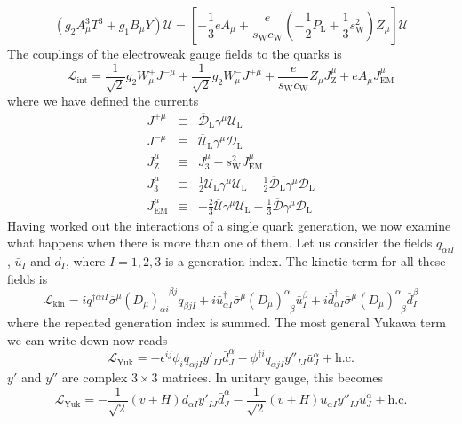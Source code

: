 \[(g_2A^3_{\mu}T^3 + g_1 B_{\mu} Y) \mathcal{U} = \left[ - \frac{1}{3}eA_{\mu} + \frac{e}{s_{\mathrm{W}} c_{\mathrm{W}}}( -\frac{1}{2}P_{\mathrm{L}} +\frac{1}{3}  s_{\mathrm{W}}^2)Z_{\mu} \right] \mathcal{U}\]
The couplings of the electroweak gauge fields to the quarks is
\[\mathcal{L}_{\mathrm{int}} = \frac{1}{\sqrt{2}}g_2W_{\mu}^{+} J^{-\mu} + \frac{1}{\sqrt{2}}g_2W_{\mu}^{-} J^{+\mu} +  \frac{e}{s_{\mathrm{W}} c_{\mathrm{W}}} Z_{\mu}J_{\mathrm{Z}}^{\mu} + eA_{\mu}J^{\mu}_{\mathrm{EM}}\] 
where we have defined the currents
\begin{eqnarray}
J^{+\mu} &\equiv & \overline{\mathcal{D}}_{\mathrm{L}} \gamma^{\mu} \mathcal{U}_{\mathrm{L}} \nonumber \\
J^{-\mu} &\equiv & \overline{\mathcal{U}}_{\mathrm{L}} \gamma^{\mu} \mathcal{D}_{\mathrm{L}} \nonumber \\
J_{\mathrm{Z}}^{\mu} &\equiv & J_3^{\mu} - s_{\mathrm{W}}^2 J^{\mu}_{\mathrm{EM}} \nonumber \\
J_3^{\mu} &\equiv & \frac{1}{2}\overline{\mathcal{U}}_{\mathrm{L}} \gamma^{\mu} \mathcal{U}_{\mathrm{L}} - \frac{1}{2}\overline{\mathcal{D}}_{\mathrm{L}} \gamma^{\mu} \mathcal{D}_{\mathrm{L}} \nonumber \\
J^{\mu}_{\mathrm{EM}} &\equiv &  +\frac{2}{3}\overline{\mathcal{U}} \gamma^{\mu} \mathcal{U}_{\mathrm{L}} - \frac{1}{3}\overline{\mathcal{D}} \gamma^{\mu} \mathcal{D}_{\mathrm{L}} \nonumber
\end{eqnarray}
Having worked out the interactions of a single quark generation, we now examine what happens when there is more than one of them.
Let us consider the fields $q_{\alpha iI}$, $\bar{u}_{I}$ and $\bar{d}_{I}$, where $I=1,2,3$ is a generation index. The kinetic term for all these fields is
\[\mathcal{L}_{\mathrm{kin}} = iq^{\dagger\alpha i I} \overline{\sigma}^{\mu}(D_{\mu})_{\alpha i}^{\phantom{\alpha i}\beta j} q_{\beta jI} + i\bar{u}_{\alpha I}^{\dagger}\overline{\sigma}^{\mu} (D_{\mu})^{\alpha}_{\phantom{\alpha}\beta}\bar{u}_I^{\beta} + i\bar{d}_{\alpha I}^{\dagger}\overline{\sigma}^{\mu} (D_{\mu})^{\alpha}_{\phantom{\alpha}\beta}\bar{d}_I^{\beta}\]
where the repeated generation index is summed. The most general Yukawa term we can write down now reads
\[\mathcal{L}_{\mathrm{Yuk}} = -\epsilon^{ij}\phi_i q_{\alpha jI}y'_{IJ} \bar{d}^{\alpha}_{J} -\phi^{\dagger i} q_{\alpha jI}y''_{IJ} \bar{u}^{\alpha}_{J} + \mathrm{h.c.}\]
$y'$ and $y''$ are complex $3 \times 3$ matrices. In unitary gauge, this becomes
\[\mathcal{L}_{\mathrm{Yuk}} = -\frac{1}{\sqrt{2}}(v+H) d_{\alpha I}y'_{IJ} \bar{d}^{\alpha}_{J} -\frac{1}{\sqrt{2}}(v+H) u_{\alpha I}y''_{IJ} \bar{u}^{\alpha}_{J} + \mathrm{h.c.}\]

